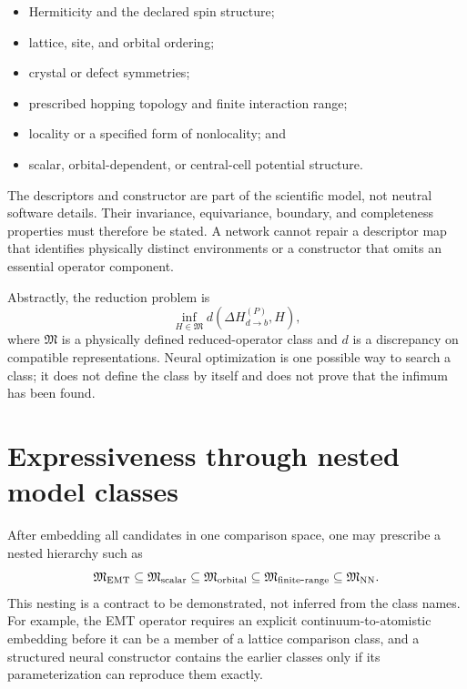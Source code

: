 \begin{itemize}
  \item Hermiticity and the declared spin structure;
  \item lattice, site, and orbital ordering;
  \item crystal or defect symmetries;
  \item prescribed hopping topology and finite interaction range;
  \item locality or a specified form of nonlocality; and
  \item scalar, orbital-dependent, or central-cell potential structure.
\end{itemize}

The descriptors and constructor are part of the scientific model, not neutral
software details. Their invariance, equivariance, boundary, and completeness
properties must therefore be stated. A network cannot repair a descriptor map
that identifies physically distinct environments or a constructor that omits
an essential operator component.

Abstractly, the reduction problem is
\begin{equation}
  \inf_{H\in\mathfrak M}
  d\!\left(\Delta H_{d\to b}^{(P)},H\right),
  \label{eq:model-class-infimum}
\end{equation}
where $\mathfrak M$ is a physically defined reduced-operator class and $d$ is a
discrepancy on compatible representations. Neural optimization is one possible
way to search a class; it does not define the class by itself and does not prove
that the infimum has been found.

\section{Expressiveness through nested model classes}


After embedding all candidates in one comparison space, one may prescribe a
nested hierarchy such as
\begin{equation}
  \mathfrak M_{\rm EMT}
  \subseteq
  \mathfrak M_{\rm scalar}
  \subseteq
  \mathfrak M_{\rm orbital}
  \subseteq
  \mathfrak M_{\rm finite\mbox{-}range}
  \subseteq
  \mathfrak M_{\rm NN}.
  \label{eq:learning-model-hierarchy}
\end{equation}
This nesting is a contract to be demonstrated, not inferred from the class
names. For example, the EMT operator requires an explicit continuum-to-atomistic
embedding before it can be a member of a lattice comparison class, and a
structured neural constructor contains the earlier classes only if its
parameterization can reproduce them exactly.

